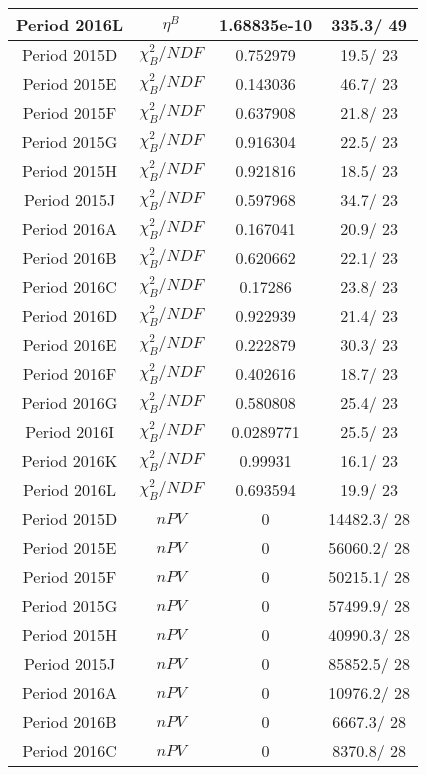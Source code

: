 \documentclass{article}
\begin{document}
\begin{longtable}{c|c|c|c}
\hline
 Period 2016L & $\eta^{B}$ & 1.68835e-10 & 335.3/ 49\\
\hline
 Period 2015D & $\chi^{2}_{B}/NDF$ & 0.752979 &  19.5/ 23\\
\hline
 Period 2015E & $\chi^{2}_{B}/NDF$ & 0.143036 &  46.7/ 23\\
\hline
 Period 2015F & $\chi^{2}_{B}/NDF$ & 0.637908 &  21.8/ 23\\
\hline
 Period 2015G & $\chi^{2}_{B}/NDF$ & 0.916304 &  22.5/ 23\\
\hline
 Period 2015H & $\chi^{2}_{B}/NDF$ & 0.921816 &  18.5/ 23\\
\hline
 Period 2015J & $\chi^{2}_{B}/NDF$ & 0.597968 &  34.7/ 23\\
\hline
 Period 2016A & $\chi^{2}_{B}/NDF$ & 0.167041 &  20.9/ 23\\
\hline
 Period 2016B & $\chi^{2}_{B}/NDF$ & 0.620662 &  22.1/ 23\\
\hline
 Period 2016C & $\chi^{2}_{B}/NDF$ & 0.17286 &  23.8/ 23\\
\hline
 Period 2016D & $\chi^{2}_{B}/NDF$ & 0.922939 &  21.4/ 23\\
\hline
 Period 2016E & $\chi^{2}_{B}/NDF$ & 0.222879 &  30.3/ 23\\
\hline
 Period 2016F & $\chi^{2}_{B}/NDF$ & 0.402616 &  18.7/ 23\\
\hline
 Period 2016G & $\chi^{2}_{B}/NDF$ & 0.580808 &  25.4/ 23\\
\hline
 Period 2016I & $\chi^{2}_{B}/NDF$ & 0.0289771 &  25.5/ 23\\
\hline
 Period 2016K & $\chi^{2}_{B}/NDF$ & 0.99931 &  16.1/ 23\\
\hline
 Period 2016L & $\chi^{2}_{B}/NDF$ & 0.693594 &  19.9/ 23\\
\hline
 Period 2015D & $nPV$ & 0 & 14482.3/ 28\\
\hline
 Period 2015E & $nPV$ & 0 & 56060.2/ 28\\
\hline
 Period 2015F & $nPV$ & 0 & 50215.1/ 28\\
\hline
 Period 2015G & $nPV$ & 0 & 57499.9/ 28\\
\hline
 Period 2015H & $nPV$ & 0 & 40990.3/ 28\\
\hline
 Period 2015J & $nPV$ & 0 & 85852.5/ 28\\
\hline
 Period 2016A & $nPV$ & 0 & 10976.2/ 28\\
\hline
 Period 2016B & $nPV$ & 0 & 6667.3/ 28\\
\hline
 Period 2016C & $nPV$ & 0 & 8370.8/ 28\\

\end{longtable}
\end{document}
